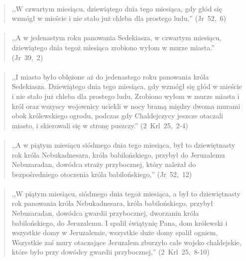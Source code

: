\documentclass[10pt,a4paper,oneside]{article}
\begin{document}
\paragraph{}
\begin{quote}
,,W czwartym miesiącu, dziewiątego dnia tego miesiąca, gdy głód się wzmógł w mieście i nie stało już chleba dla prostego ludu,'' \mbox{(Jr 52, 6)}
\end{quote}
\paragraph{}
\begin{quote}
,,A w jedenastym roku panowania Sedekiasza, w czwartym miesiącu, dziewiątego dnia tegoż miesiąca zrobiono wyłom w murze miasta.'' \mbox{(Jr 39, 2)}
\end{quote}
\paragraph{}
\begin{quote}
,,I miasto było oblężone aż do jedenastego roku panowania króla Sedekiasza. Dziewiątego dnia tego miesiąca, gdy wzmógł się głód w mieście i nie stało już chleba dla prostego ludu, Zrobiono wyłom w murze miasta i król oraz wszyscy wojownicy uciekli w nocy bramą między dwoma murami obok królewskiego ogrodu, podczas gdy Chaldejczycy jeszcze otaczali miasto, i skierowali się w stronę puszczy.'' \mbox{(2 Krl 25, 2-4)}
\end{quote}
\paragraph{}
\begin{quote}
,,A w piątym miesiącu siódmego dnia tego miesiąca, był to dziewiętnasty rok króla Nebukadnesara, króla babilońskiego, przybył do Jeruzalemu Nebuzaradan, dowódca straży przybocznej, który należał do bezpośredniego otoczenia króla babilońskiego,'' \mbox{(Jr 52, 12)}
\end{quote}
\paragraph{}
\begin{quote}
,,W piątym miesiącu, siódmego dnia tegoż miesiąca, a był to dziewiętnasty rok panowania króla Nebukadnesara, króla babilońskiego, przybył Nebuzaradan, dowódca gwardii przybocznej, dworzanin króla babilońskiego, do Jeruzalemu. I spalił świątynię Pana, dom królewski i wszystkie domy w Jeruzalemie, wszystkie duże domy spalił ogniem, Wszystkie zaś mury otaczające Jeruzalem zburzyło całe wojsko chaldejskie, które było przy dowódcy gwardii przybocznej,'' \mbox{(2 Krl 25, 8-10)}
\end{quote}
\end{document}
